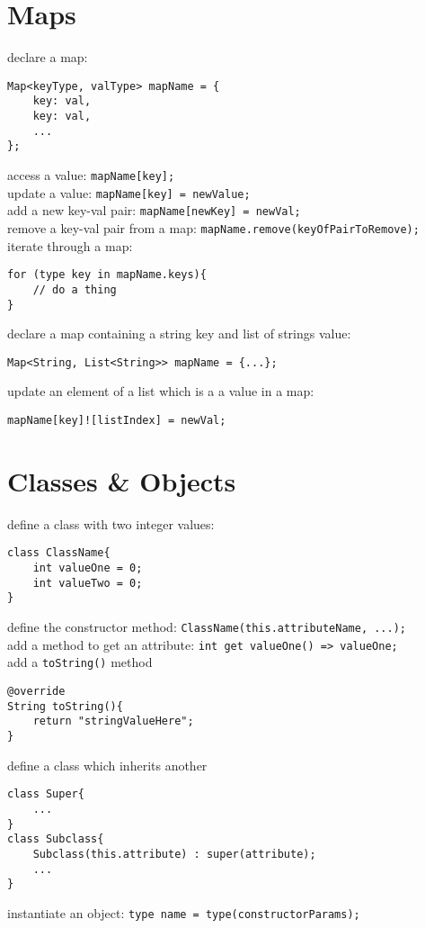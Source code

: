 \documentclass[a4paper,11pt]{article}
\begin{document}
\section{Maps}
declare a map:
\begin{verbatim}
Map<keyType, valType> mapName = {
    key: val,
    key: val,
    ...
};
\end{verbatim}
access a value: \verb|mapName[key];|\\
update a value: \verb|mapName[key] = newValue;|\\
add a new key-val pair: \verb|mapName[newKey] = newVal;|\\
remove a key-val pair from a map: \verb|mapName.remove(keyOfPairToRemove);|\\
iterate through a map:
\begin{verbatim}
for (type key in mapName.keys){
    // do a thing
}
\end{verbatim}
declare a map containing a string key and list of strings value:
\begin{verbatim}
Map<String, List<String>> mapName = {...};
\end{verbatim}
update an element of a list which is a a value in a map:
\begin{verbatim}
mapName[key]![listIndex] = newVal;
\end{verbatim}

\section{Classes \& Objects}
define a class with two integer values:
\begin{verbatim}
class ClassName{
    int valueOne = 0;
    int valueTwo = 0;
}
\end{verbatim}
define the constructor method: \verb|ClassName(this.attributeName, ...);|\\
add a method to get an attribute: \verb|int get valueOne() => valueOne;|\\
add a \verb|toString()| method
\begin{verbatim}
@override
String toString(){
    return "stringValueHere";
}
\end{verbatim}
define a class which inherits another
\begin{verbatim}
class Super{
    ...
}
class Subclass{
    Subclass(this.attribute) : super(attribute);
    ...
}
\end{verbatim}

instantiate an object: \verb|type name = type(constructorParams);|
\end{document}
